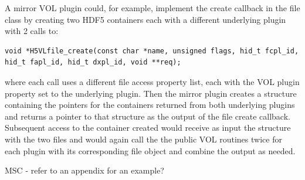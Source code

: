 A mirror VOL plugin could, for example, implement the create callback in the file class by creating two HDF5 containers each with a different underlying plugin with 2 calls to:
\begin{lstlisting}
void *H5VLfile_create(const char *name, unsigned flags, hid_t fcpl_id, hid_t fapl_id, hid_t dxpl_id, void **req);
\end{lstlisting}
where each call uses a different file access property list, each with the VOL plugin property set to the underlying plugin. Then the mirror plugin creates a structure containing the pointers for the containers returned from both underlying plugins and returns a pointer to that structure as the output of the file create callback. Subsequent access to the container created would receive as input the structure with the two files and would again call the the public VOL routines twice for each plugin with its corresponding file object and combine the output as needed. 

MSC - refer to an appendix for an example?

